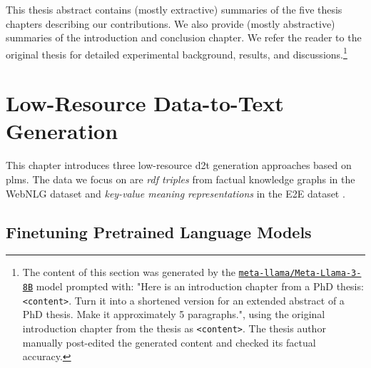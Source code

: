 \documentclass[12pt,notitlepage,a4paper,oneside,openany]{report}
\renewcommand\cite{\citep}
\begin{document}
This thesis abstract contains (mostly extractive) summaries of the five thesis chapters describing our contributions. We also provide (mostly abstractive) summaries of the introduction and conclusion chapter. We refer the reader to the original thesis for detailed experimental background, results, and discussions.\footnote{The content of this section was generated by the \href{https://huggingface.co/meta-llama/Meta-Llama-3-8B}{\texttt{meta-llama/Meta-Llama-3-8B}} model prompted with: "Here is an introduction chapter from a PhD thesis: \texttt{<content>}. Turn it into a shortened version for an extended abstract of a PhD thesis. Make it approximately 5 paragraphs.", using the original introduction chapter from the thesis as \texttt{<content>}. The thesis author manually post-edited the generated content and checked its factual accuracy.}

\chapter{Low-Resource Data-to-Text Generation}
\label{chap:low-res}

This chapter introduces three low-resource \ac{d2t} generation approaches based on \acp{plm}. The data we focus on are \emph{\acs{rdf} triples} from factual knowledge graphs in the WebNLG dataset \cite{gardentWebNLGChallengeGenerating2017} and \emph{key-value meaning representations} in the E2E dataset \cite{dusekEvaluatingStateoftheartEndtoEnd2020,dusekSemanticNoiseMatters2019}.


\section{Finetuning Pretrained Language Models}
\label{sec:finetuning}
\end{document}
